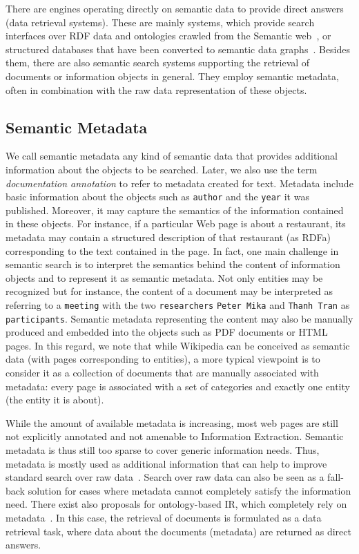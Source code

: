 There are engines operating directly on semantic data to provide direct answers (data retrieval systems). These are mainly systems, which provide search interfaces over RDF data and ontologies crawled from the Semantic web~\cite{DBLP:journals/ijswis/ChengQ09,DBLP:journals/ws/TranWH09,DBLP:journals/ws/HoganHUKPD11}, or structured databases that have been converted to semantic data graphs~\cite{DBLP:conf/sigmod/LiJLF09,DBLP:conf/sigmod/LiOFWZ08}. Besides them, there are also semantic search systems supporting the retrieval of documents or information objects in general. They employ semantic metadata, often in combination with the raw data representation of these objects. 
	
\subsection{Semantic Metadata}
We call semantic metadata any kind of semantic data that provides additional information about the objects to be searched. Later, we also use the term \emph{documentation annotation} to refer to metadata created for text. Metadata include basic information about the objects such as \verb+author+ and the \verb+year+ it was published. Moreover, it may capture the semantics of the information contained in these objects. For instance, if a particular Web page is about a restaurant, its metadata may contain a structured description of that restaurant (as RDFa) corresponding to the text contained in the page. In fact, one main challenge in semantic search is to interpret the semantics behind the content of information objects and to represent it as semantic metadata. Not only entities may be recognized but for instance, the content of a document may be interpreted as referring to a \verb+meeting+ with the two \verb+researchers+ \verb+Peter Mika+ and \verb+Thanh Tran+ as \verb+participants+. Semantic metadata representing the content may also be manually produced and embedded into the objects such as PDF documents or HTML pages. In this regard, we note that while Wikipedia can be conceived as semantic data (with pages corresponding to entities), a more typical viewpoint is to consider it as a collection of documents that are manually associated with metadata: every page is associated with a set of categories and exactly one entity (the entity it is about).  




While the amount of available metadata is increasing, most web pages are still not explicitly annotated and not amenable to Information Extraction. Semantic metadata is thus still too sparse to cover generic information needs. Thus, metadata is mostly used as additional information that can help to improve standard search over raw data~\cite{DBLP:journals/tkde/CastellsFV07,DBLP:journals/ws/FernandezCLVCM11}. Search over raw data can also be seen as a fall-back solution for cases where metadata cannot completely satisfy the information need. There exist also 	proposals for ontology-based IR, which completely rely on metadata~\cite{tran2007expressive}. In this case, the retrieval of documents is formulated as a data retrieval task, where data about the documents (metadata) are returned as direct answers. 

